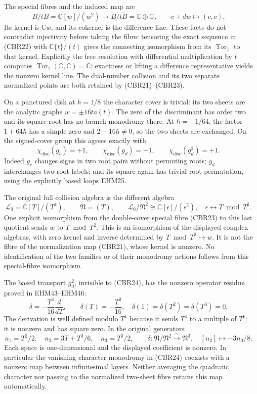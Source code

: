 \documentclass[
  10pt,
  a4paper,
]{article}
\begin{document}
The special fibres and the induced map are \[
B/tB=\mathbb C[w]/(w^2)
\longrightarrow\widetilde B/t\widetilde B=\mathbb C\oplus\mathbb C,
\qquad c+dw\longmapsto(c,c).
\tag{CBR23}
\] Its kernel is \(\mathbb Cw\), and its cokernel is the difference
line. These facts do not contradict injectivity before taking the fibre:
tensoring the exact sequence in (CBR22) with \(\mathbb C\{t\}/(t)\)
gives the connecting isomorphism from its \(\operatorname{Tor}_1\) to
that kernel. Explicitly the free resolution with differential
multiplication by \(t\) computes
\(\operatorname{Tor}_1(\mathbb C,\mathbb C)=\mathbb C\); exactness or
lifting a difference representative yields the nonzero kernel line. The
dual-number collision and its two separate normalized points are both
retained by (CBR21)--(CBR23).

On a punctured disk at \(h=1/8\) the character cover is trivial: its two
sheets are the analytic graphs \(w=\pm16ta(t)\). The zero of the
discriminant has order two and its square root has no branch monodromy
there. At \(h=-1/64\), the factor \(1+64h\) has a simple zero and
\(2-16h\ne0\), so the two sheets are exchanged. On the signed-cover
group this agrees exactly with \[
\chi_{\mathrm{disc}}(g_c)=+1,\qquad
\chi_{\mathrm{disc}}(g_d)=-1,\qquad
\chi_{\mathrm{disc}}(g_d^2)=+1.
\tag{CBR24}
\] Indeed \(g_c\) changes signs in two root pairs without permuting
roots; \(g_d\) interchanges two root labels; and its square again has
trivial root permutation, using the explicitly based loops EHM25.

The original full collision algebra is the different algebra \[
\mathscr L_0=\mathbb C[T]/(T^4),\qquad
\mathfrak N=(T),\qquad
\mathscr L_0/\mathfrak N^2\cong\mathbb C[\epsilon]/(\epsilon^2),
\quad \epsilon\longleftrightarrow T\bmod T^2.
\tag{CBR25}
\] One explicit isomorphism from the double-cover special fibre (CBR23)
to this last quotient sends \(w\) to \(T\bmod T^2\). This is an
isomorphism of the displayed complex algebras, with zero kernel and
inverse determined by \(T\bmod T^2\mapsto w\). It is not the fibre of
the normalization map (CBR21), whose kernel is nonzero. No
identification of the two families or of their monodromy actions follows
from this special-fibre isomorphism.

The based transport \(g_d^2\), invisible to (CBR24), has the nonzero
operator residue proved in EHM43--EHM46: \[
\delta=-\frac{T^3}{16}\frac{d}{dT},\qquad
\delta(T)=-\frac{T^3}{16},\quad
\delta(1)=\delta(T^2)=\delta(T^3)=0.
\tag{CBR26}
\] The derivation is well defined modulo \(T^4\) because it sends
\(T^4\) to a multiple of \(T^6\); it is nonzero and has square zero. In
the original generators \[
n_1=T^2/2,\quad n_2=3T+T^3/6,\quad n_3=T^3/2,
\qquad
\delta:\mathfrak N/\mathfrak N^2\xrightarrow{\ \sim\ }\mathfrak N^3,
\quad[n_2]\longmapsto-3n_3/8.
\tag{CBR27}
\] Each space is one-dimensional and the displayed coefficient is
nonzero. In particular the vanishing character monodromy in (CBR24)
coexists with a nonzero map between infinitesimal layers. Neither
averaging the quadratic character nor passing to the normalized
two-sheet fibre retains this map automatically.
\end{document}
